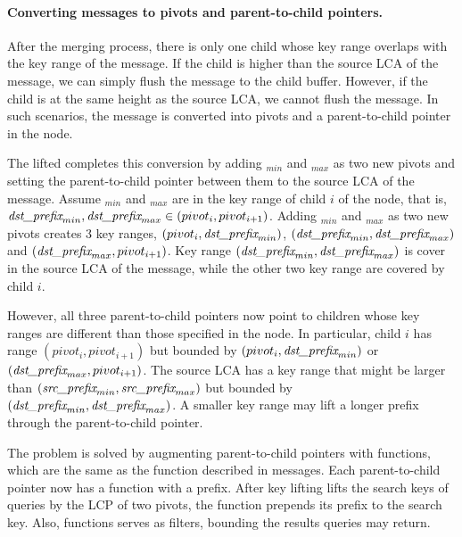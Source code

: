 \paragraph{Converting \goto messages to pivots and parent-to-child pointers.}
After the merging process, there is only one child whose key range overlaps
with the key range of the \goto message.
If the child is higher than the source LCA of the \goto message,
we can simply flush the \goto message to the child buffer.
However, if the child is at the same height as the source LCA,
we cannot flush the \goto message.
In such scenarios, the \goto message is converted into pivots and a
parent-to-child pointer in the node.

The lifted \bedag completes this conversion by adding
\dpre$_{min}$ and \dpre$_{max}$ as two new pivots and
setting the parent-to-child pointer between them to the source LCA of the
\goto message.
Assume \dpre$_{min}$ and \dpre$_{max}$ are in the key range of child $i$ of the node,
that is, $\textit{dst\_prefix}_{min}, \textit{dst\_prefix}_{max} \in (pivot_{i},pivot_{i+1})$.
Adding \dpre$_{min}$ and \dpre$_{max}$ as two new pivots creates 3 key ranges,
$(pivot_{i},\textit{dst\_prefix}_{min})$, $(\textit{dst\_prefix}_{min},\textit{dst\_prefix}_{max})$ and
$(\textit{dst\_prefix}_{max}, pivot_{i+1})$.
Key range $(\textit{dst\_prefix}_{min},\textit{dst\_prefix}_{max})$ is cover in the source LCA of the \goto
message, while the other two key range are covered by child $i$.

However, all three parent-to-child pointers now point to children whose key
ranges are different than those specified in the node.
In particular, child $i$ has range $(pivot_{i},pivot_{i+1})$ but bounded by
$(pivot_{i},\textit{dst\_prefix}_{min})$ or $(\textit{dst\_prefix}_{max}, pivot_{i+1})$.
The source LCA has a key range that might be larger than
$(\textit{src\_prefix}_{min}, \textit{src\_prefix}_{max})$ but bounded by $(\textit{dst\_prefix}_{min},\textit{dst\_prefix}_{max})$.
A smaller key range may lift a longer prefix through the parent-to-child
pointer.

The problem is solved by augmenting parent-to-child pointers with \xf functions,
which are the same as the \xf function described in \goto messages.
Each parent-to-child pointer now has a \xf function with a prefix.
After key lifting lifts the search keys of queries by the LCP of two pivots,
the \xf function prepends its prefix to the search key.
Also, \xf functions serves as filters, bounding the results queries may return.

